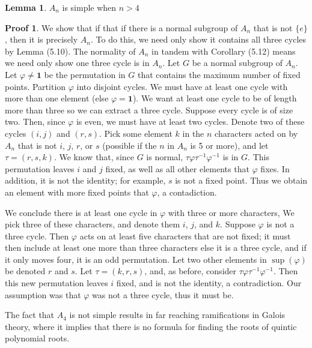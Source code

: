 \documentclass[12pt]{amsbook}
\theoremstyle{definition}
\newtheorem{lemma}[theorem]{Lemma}
\newtheorem*{prf}{Proof}
\begin{document}
\begin{lemma} $A_n$ is simple when $n > 4$ \end{lemma}
\begin{prf} We show that if that if there is a normal subgroup of $A_n$ that is not $\{ e \}$, then it is precisely $A_n$. To do this, we need only show it contains all three cycles by Lemma (5.10). The normality of $A_n$ in tandem with Corollary (5.12) means we need only show one three cycle is in $A_n$. Let $G$ be a normal subgroup of $A_n$. Let $\varphi \neq \mathbf{1}$ be the permutation in $G$ that contains the maximum number of fixed points. Partition $\varphi$ into disjoint cycles. We must have at least one cycle with more than one element (else $\varphi = \mathbf{1}$). We want at least one cycle to be of length more than three so we can extract a three cycle. Suppose every cycle is of size two. Then, since $\varphi$ is even, we must have at least two cycles. Denote two of these cycles $(i, j)$ and $(r, s)$. Pick some element $k$ in the $n$ characters acted on by $A_n$ that is not $i$, $j$, $r$, or $s$ (possible if the $n$ in $A_n$ is 5 or more), and let $\tau = (r, s, k)$. We know that, since $G$ is normal, $\tau \varphi \tau^{-1} \varphi^{-1}$ is in $G$. This permutation leaves $i$ and $j$ fixed, as well as all other elements that $\varphi$ fixes. In addition, it is not the identity; for example, $s$ is not a fixed point. Thus we obtain an element with more fixed points that $\varphi$, a contadiction.

We conclude there is at least one cycle in $\varphi$ with three or more characters, We pick three of these characters, and denote them $i$, $j$, and $k$. Suppose $\varphi$ is not a three cycle. Then $\varphi$ acts on at least five characters that are not fixed; it must then include at least one more than three characters else it is a three cycle, and if it only moves four, it is an odd permutation. Let two other elements in $\sup(\varphi)$ be denoted $r$ and $s$. Let $\tau = (k, r, s)$, and, as before, consider $\tau \varphi \tau^{-1} \varphi^{-1}$. Then this new permutation leaves $i$ fixed, and is not the identity, a contradiction. Our assumption was that $\varphi$ was not a three cycle, thus it must be.
\end{prf}

The fact that $A_4$ is not simple results in far reaching ramifications in Galois theory, where it implies that there is no formula for finding the roots of quintic polynomial roots.

\clearpage
\end{document}
